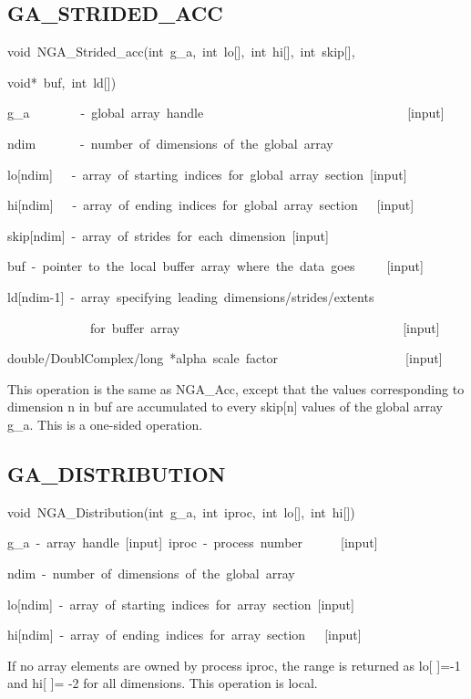 \subsection*{\label{sub:GA_STRIDED_ACC}GA\_STRIDED\_ACC}
\begin{lyxcode}
void~NGA\_Strided\_acc(int~g\_a,~int~lo{[}{]},~int~hi{[}{]},~int~skip{[}{]},~

void{*}~buf,~int~ld{[}{]})



g\_a~~~~~~~~-~global~array~handle~~~~~~~~~~~~~~~~~~~~~~~~~~~~~~~~{[}input{]}~

ndim~~~~~~~-~number~of~dimensions~of~the~global~array~

lo{[}ndim{]}~~~-~array~of~starting~indices~for~global~array~section~{[}input{]}

hi{[}ndim{]}~~~-~array~of~ending~indices~for~global~array~section~~~{[}input{]}

skip{[}ndim{]}~-~array~of~strides~for~each~dimension~{[}input{]}~

buf~-~pointer~to~the~local~buffer~array~where~the~data~goes~~~~~{[}input{]}

ld{[}ndim-1{]}~-~array~specifying~leading~dimensions/strides/extents~

~~~~~~~~~~~~~for~buffer~array~~~~~~~~~~~~~~~~~~~~~~~~~~~~~~~~~~~{[}input{]}~

double/DoublComplex/long~{*}alpha~scale~factor~~~~~~~~~~~~~~~~~~~~{[}input{]}
\end{lyxcode}
This operation is the same as NGA\_Acc, except that the values corresponding
to dimension n in buf are accumulated to every skip{[}n{]} values
of the global array g\_a. This is a one-sided operation. 


\subsection*{\label{sub:GA_DISTRIBUTION}GA\_DISTRIBUTION}
\begin{lyxcode}
void~NGA\_Distribution(int~g\_a,~int~iproc,~int~lo{[}{]},~int~hi{[}{]})



g\_a~-~array~handle~{[}input{]}~iproc~-~process~number~~~~~~{[}input{]}~

ndim~-~number~of~dimensions~of~the~global~array~

lo{[}ndim{]}~-~array~of~starting~indices~for~array~section~{[}input{]}

hi{[}ndim{]}~-~array~of~ending~indices~for~array~section~~~{[}input{]}
\end{lyxcode}
If no array elements are owned by process iproc, the range is returned
as lo{[} {]}=-1 and hi{[} {]}= -2 for all dimensions. This operation
is local. 


